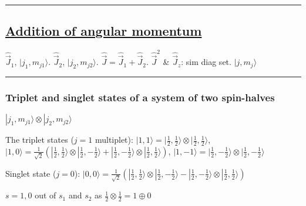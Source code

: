 \hrule height 0.05pt

\subsection{\underline{Addition of angular momentum}}

$\widehat{\vec{J}}_1$, $|j_1, m_{j1} \rangle$. $\widehat{\vec{J}}_2$, $|j_2, m_{j2} \rangle$. $\widehat{\vec{J}} = \widehat{\vec{J}}_1 + \widehat{\vec{J}}_2$.
$\widehat{\vec{J}}^2$ \& $\widehat{\vec{J}}_z$: sim diag set. $|j, m_j \rangle$

\hrule height 0.05pt

\subsubsection{Triplet and singlet states of a system of two spin-halves}

$| j_1, m_{j1} \rangle \otimes | j_2, m_{j2} \rangle$


The triplet states ($j=1$ multiplet):
$|1, 1 \rangle = |\frac{1}{2}, \frac{1}{2} \rangle \otimes | \frac{1}{2}, \frac{1}{2} \rangle$, 
$|1, 0 \rangle = \frac{1}{\sqrt{2}} (|\frac{1}{2}, \frac{1}{2} \rangle \otimes | \frac{1}{2}, -\frac{1}{2} \rangle + | \frac{1}{2}, -\frac{1}{2} \rangle \otimes | \frac{1}{2}, \frac{1}{2} \rangle)$,
$|1, -1 \rangle = |\frac{1}{2}, -\frac{1}{2} \rangle \otimes |\frac{1}{2}, -\frac{1}{2} \rangle$

Singlet state ($j=0$): $|0,0 \rangle = \frac{1}{\sqrt{2}} (|\frac{1}{2}, \frac{1}{2} \rangle \otimes |\frac{1}{2}, -\frac{1}{2} \rangle - | \frac{1}{2}, -\frac{1}{2} \rangle \otimes |\frac{1}{2}, \frac{1}{2} \rangle)$

$s=1, 0$ out of $s_1$ and $s_2$ as $\frac{1}{2} \otimes \frac{1}{2} = 1 \oplus 0$



